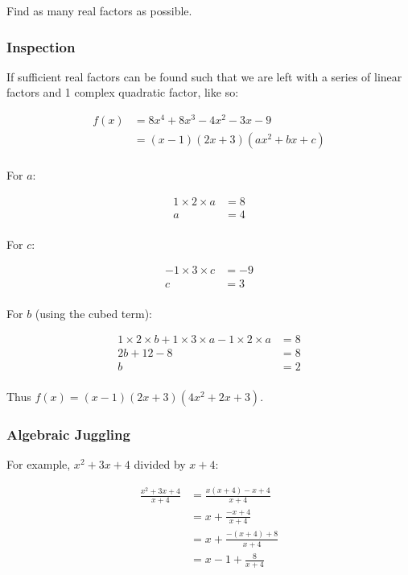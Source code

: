 \documentclass[a4paper,11pt]{article}
\begin{document}
Find as many real factors as possible.


\subsubsection{Inspection}

If sufficient real factors can be found such that we are left with a series of
linear factors and 1 complex quadratic factor, like so:

$$
\begin{aligned}
f(x) & = 8x^4 + 8x^3 - 4x^2 - 3x - 9 \\
& = (x - 1)(2x + 3)(ax^2 + bx + c) \\
\end{aligned}
$$

For $a$:

$$
\begin{aligned}
1 \times 2 \times a & = 8 \\
a & = 4 \\
\end{aligned}
$$

For $c$:

$$
\begin{aligned}
-1 \times 3 \times c & = -9 \\
c & = 3 \\
\end{aligned}
$$

For $b$ (using the cubed term):

$$
\begin{aligned}
1 \times 2 \times b + 1 \times 3 \times a - 1 \times 2 \times a & = 8 \\
2b + 12 - 8 & = 8 \\
b & = 2 \\
\end{aligned}
$$

Thus $f(x) = (x - 1)(2x + 3)(4x^2 + 2x + 3)$.


\subsubsection{Algebraic Juggling}

For example, $x^2 + 3x + 4$ divided by $x + 4$:

$$
\begin{aligned}
\frac{x^2 + 3x + 4}{x + 4} & = \frac{x(x + 4) - x + 4}{x + 4} \\
& = x + \frac{-x + 4}{x + 4} \\
& = x + \frac{-(x + 4) + 8}{x + 4} \\
& = x - 1 + \frac{8}{x + 4} \\
\end{aligned}
$$
\end{document}
